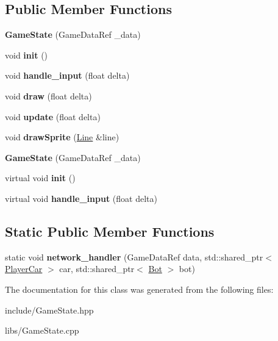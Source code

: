 \subsection*{Public Member Functions}
\begin{DoxyCompactItemize}
\item 
\mbox{\label{classcp_1_1_game_state_af8b15ea02a00d2952500404ba4ae63b8}} 
{\bfseries Game\+State} (Game\+Data\+Ref \+\_\+data)
\item 
\mbox{\label{classcp_1_1_game_state_a91fc8fff6e06a8fddb4b4ea785bdcf0e}} 
void {\bfseries init} ()
\item 
\mbox{\label{classcp_1_1_game_state_af9c8395fedd3343337f2e249669d8e52}} 
void {\bfseries handle\+\_\+input} (float delta)
\item 
\mbox{\label{classcp_1_1_game_state_a17b81f0c87209d967c571393b3a493d9}} 
void {\bfseries draw} (float delta)
\item 
\mbox{\label{classcp_1_1_game_state_abe654ab4d56344d7897b5e93be36e5f3}} 
void {\bfseries update} (float delta)
\item 
\mbox{\label{classcp_1_1_game_state_a34e5851e826d9b73c80648d86ca729de}} 
void {\bfseries draw\+Sprite} (\hyperlink{classcp_1_1_line}{Line} \&line)
\item 
\mbox{\label{classcp_1_1_game_state_af8b15ea02a00d2952500404ba4ae63b8}} 
{\bfseries Game\+State} (Game\+Data\+Ref \+\_\+data)
\item 
\mbox{\label{classcp_1_1_game_state_aaaa06069d85774c0dca85a99989da467}} 
virtual void {\bfseries init} ()
\item 
\mbox{\label{classcp_1_1_game_state_a326eebfad824224c4d01588839c42e3d}} 
virtual void {\bfseries handle\+\_\+input} (float delta)
\end{DoxyCompactItemize}
\subsection*{Static Public Member Functions}
\begin{DoxyCompactItemize}
\item 
\mbox{\label{classcp_1_1_game_state_aabbafbae2e0067041117d8395b246526}} 
static void {\bfseries network\+\_\+handler} (Game\+Data\+Ref data, std\+::shared\+\_\+ptr$<$ \hyperlink{classcp_1_1_player_car}{Player\+Car} $>$ car, std\+::shared\+\_\+ptr$<$ \hyperlink{classcp_1_1_bot}{Bot} $>$ bot)
\end{DoxyCompactItemize}


The documentation for this class was generated from the following files\+:\begin{DoxyCompactItemize}
\item 
include/Game\+State.\+hpp\item 
libs/Game\+State.\+cpp\end{DoxyCompactItemize}
